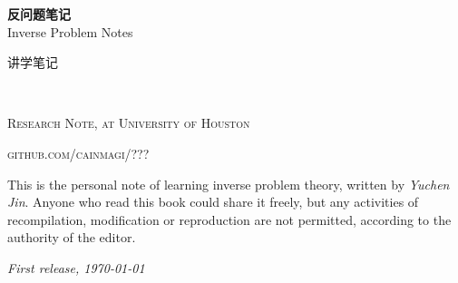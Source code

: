 \documentclass[mainfont=Libertine,Chinese]{CMNBook} %
\renewcommand{\FrameFolder}{FramePics/inversebook/}
\begin{document}

\begingroup
\thispagestyle{empty}
\centering
\vspace*{5cm}
\begin{tcolorbox}[standard jigsaw, colframe=ocre, arc=16pt,
	opacityframe=1, opacityback=0.7]
	\centering
	\vspace*{0.5cm}
	\par\normalfont\fontsize{35}{35}\sffamily\selectfont
	\textbf{反问题笔记}\\
	{\LARGE Inverse Problem Notes}\par %
	\vspace*{1cm}
	{\Huge 讲学笔记}\par %
	\vspace*{0.5cm}
\end{tcolorbox}
\endgroup


\newpage
~\vfill
\thispagestyle{empty}


\noindent \textsc{Research Note, at University of Houston}

\noindent \textsc{github.com/cainmagi/???} %

\noindent This is the personal note of learning inverse problem theory, written by \textit{Yuchen Jin}. Anyone who read this book could share it freely, but any activities of recompilation, modification or reproduction are not permitted, according to the authority of the editor. %

\noindent \textit{First release, \today} %



\pagestyle{empty} %

\renewcommand\contentsname{目~~录}
\tableofcontents %


\pagestyle{fancy} %



\end{document}
